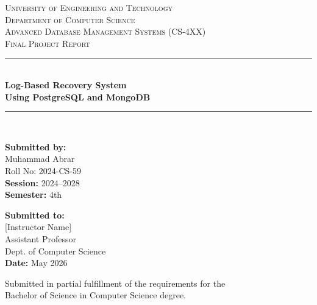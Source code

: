 \documentclass[12pt, a4paper]{report}
\newcommand{\HRule}{\rule{\linewidth}{0.5mm}}
\begin{document}
\begin{titlepage}
\begin{center}

\textsc{\large University of Engineering and Technology}\\[0.3cm]
\textsc{\large Department of Computer Science}\\[0.5cm]
\textsc{Advanced Database Management Systems (CS-4XX)}\\[0.3cm]
\textsc{Final Project Report}\\[1.5cm]

\HRule\\[0.5cm]
{\huge \bfseries Log-Based Recovery System}\\[0.3cm]
{\large \bfseries Using PostgreSQL and MongoDB}\\[0.3cm]
\HRule\\[1.5cm]

\begin{minipage}{0.48\textwidth}
  \begin{flushleft}
    \textbf{Submitted by:}\\[0.2cm]
    Muhammad Abrar\\
    Roll No: 2024-CS-59\\[0.5cm]
    \textbf{Session:} 2024--2028\\
    \textbf{Semester:} 4th
  \end{flushleft}
\end{minipage}
\hfill
\begin{minipage}{0.48\textwidth}
  \begin{flushright}
    \textbf{Submitted to:}\\[0.2cm]
    [Instructor Name]\\
    Assistant Professor\\
    Dept. of Computer Science\\[0.5cm]
    \textbf{Date:} May 2026
  \end{flushright}
\end{minipage}

\vfill

\begin{figure}[H]
  \centering
\end{figure}

\vfill
{\small Submitted in partial fulfillment of the requirements for the\\
Bachelor of Science in Computer Science degree.}

\end{center}
\end{titlepage}
\end{document}
